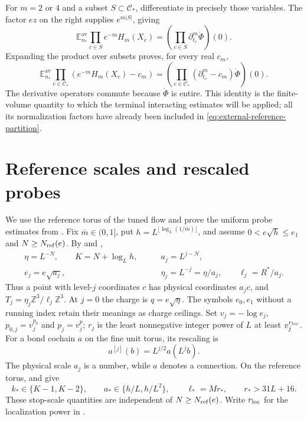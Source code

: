 \documentclass[11pt,letterpaper,reqno]{amsart}
\newcommand{\Z}{\mathbb Z}
\newcommand{\E}{\mathbb E}
\begin{document}
For $m=2$ or $4$ and a subset $S\subset\mathcal C_*$,
differentiate in precisely those variables. The
factor $ez$ on the right supplies $e^{m|S|}$, giving
\[
 \E_{n_*}^{\mathrm{av}}\prod_{c\in S}e^{-m}H_m(X_c)
         =\left(\prod_{c\in S}\partial_{t_c}^m
                                      \mathring\Phi\right)(0).
\]
Expanding the product over subsets proves, for
every real $c_m$,
\begin{equation}\label{eq:external-Wick-product}
 \E_{n_*}^{\mathrm{av}}
        \prod_{c\in\mathcal C_*}(e^{-m}H_m(X_c)-c_m)
     =\left(\prod_{c\in\mathcal C_*}
                (\partial_{t_c}^m-c_m)\mathring\Phi\right)(0).
\end{equation}
The derivative operators commute because
$\mathring\Phi$ is entire. This identity is the
finite-volume quantity to which the terminal
interacting estimates will be applied; all its
normalization factors have already been included
in \eqref{eq:external-reference-partition}.


\section{Reference scales and rescaled probes}
\label{subsec:interacting-stop-probe}

We use the reference torus of the tuned flow and prove the
uniform probe estimates from \cite[\S21.1]{QED3Master}.
Fix $\bar m\in(0,1]$, put
$h=L^{\lfloor\log_L(1/\bar m)\rfloor}$, and assume
$0<e\sqrt h\le e_1$ and $N\ge N_{\rm ref}(e)$.
By \cite[(47)]{CoverTuning} and
\cite[(53)]{CoverTuning},
\begin{equation}\label{eq:interacting-physical-scales}
 \begin{aligned}
 \eta=L^{-N},\qquad K=N+\log_Lh,\qquad
 &a_j=L^{j-N},\\
 e_j=e\sqrt{a_j},\qquad
 &\eta_j=L^{-j}=\eta/a_j,\qquad \ell_j=R^*/a_j .
 \end{aligned}
\end{equation}
Thus a point with level-$j$ coordinates $c$
has physical coordinates $a_jc$, and
$T_j=\eta_j\Z^3/\ell_j\Z^3$.
At $j=0$ the charge is $q=e\sqrt\eta$.
The symbols $e_0,e_1$ without a running
index retain their meanings as charge ceilings.
Set $v_j=-\log e_j$, $p_{0,j}=v_j^{p_0}$ and $p_j=v_j^p$;
$r_j$ is the least nonnegative integer power of $L$ at least
$v_j^{r_{\rm loc}}$.
For a bond cochain $a$ on the fine unit torus,
its rescaling is
\begin{equation}\label{eq:interacting-connection-rescaling}
                    a^{[j]}(b)=L^{j/2}a(L^jb).
\end{equation}
The physical scale $a_j$ is a number, while
$a$ denotes a connection.
On the reference torus,
\cite[(54)]{CoverTuning} and
\cite[(50)]{CoverTuning} give
\[
 k_*\in\{K-1,K-2\},\qquad
 a_*\in\{h/L,h/L^2\},\qquad
 \ell_*=Mr_*,\qquad r_*>31L+16.
\]
These stop-scale quantities are independent
of $N\ge N_{\rm ref}(e)$.
Write $r_{\rm loc}$ for the localization
power in \cite[\S6.1]{CoverTuning}.
\end{document}
